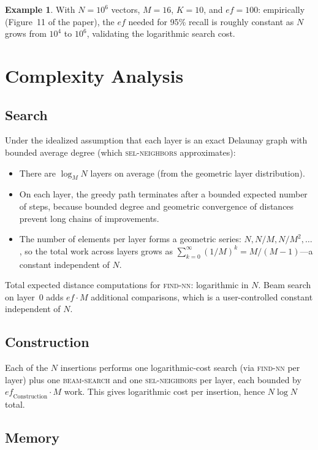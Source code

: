 \documentclass[11pt]{article}
\newcommand{\ef}{\mathit{ef}}
\theoremstyle{definition}
\newtheorem{example}{Example}
\begin{document}
\begin{example}
  With $N = 10^6$ vectors, $M = 16$, $K = 10$, and $\ef = 100$: empirically (Figure~11 of the paper), the $\ef$ needed for 95\% recall is roughly constant as $N$ grows from $10^4$ to $10^6$, validating the logarithmic search cost.
\end{example}

\section{Complexity Analysis}
\label{sec:complexity}

\subsection{Search}

Under the idealized assumption that each layer is an exact Delaunay graph with bounded average degree (which \textsc{sel-neighbors} approximates):
\begin{itemize}
  \item There are $\log_M N$ layers on average (from the geometric layer distribution).
  \item On each layer, the greedy path terminates after a bounded expected number of steps, because bounded degree and geometric convergence of distances prevent long chains of improvements.
  \item The number of elements per layer forms a geometric series: $N, N/M, N/M^2, \ldots$, so the total work across layers grows as $\sum_{k=0}^{\infty} (1/M)^k = M/(M-1)$---a constant independent of $N$.
\end{itemize}
Total expected distance computations for \textsc{find-nn}: logarithmic in $N$. Beam search on layer~0 adds $\ef \cdot M$ additional comparisons, which is a user-controlled constant independent of $N$.

\subsection{Construction}

Each of the $N$ insertions performs one logarithmic-cost search (via \textsc{find-nn} per layer) plus one \textsc{beam-search} and one \textsc{sel-neighbors} per layer, each bounded by $\ef_{\mathrm{Construction}} \cdot M$ work. This gives logarithmic cost per insertion, hence $N \log N$ total.

\subsection{Memory}
\end{document}
